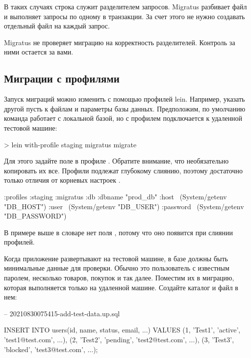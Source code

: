 В таких случаях строка \code{--;;} служит разделителем запросов. Migratus разбивает файл и выполняет запросы по одному в транзакции. За счет этого не нужно создавать отдельный файл на каждый запрос.

Migratus не проверяет миграцию на корректность разделителей. Контроль за ними остается за вами.

\subsection{Миграции с профилями}

Запуск миграций можно изменить с помощью профилей lein. Например, указать другой пусть к файлам и параметры базы данных. Предположим, по умолчанию команда  работает с локальной базой, но с профилем  подключается к удаленной тестовой машине:

\begin{english}
  \begin{bash}
> lein with-profile staging migratus migrate
  \end{bash}
\end{english}

Для этого задайте поле  в профиле . Обратите внимание, что необязательно копировать их все. Профили  подлежат глубокому слиянию, поэтому достаточно только отличия от корневых настроек .

\begin{english}
  \begin{clojure}
{:profiles
 {:staging
  {:migratus
   {:db {:dbname "prod_db"
         :host ~(System/getenv "DB_HOST")
         :user ~(System/getenv "DB_USER")
         :password ~(System/getenv "DB_PASSWORD")}}}}}
  \end{clojure}
\end{english}

В примере выше в словаре  нет поля , потому что оно появится при слиянии профилей.





Когда приложение развертывают на тестовой машине, в базе должны быть минимальные данные для проверки. Обычно это пользователь с известным паролем, несколько товаров, покупок и так далее. Поместим их в миграцию, которая выполняется только на удаленной машине. Создайте каталог  и файл в нем:

\begin{english}
  \begin{sql}
-- 20210830075415-add-test-data.up.sql

INSERT INTO users(id, name, status, email, ...)
VALUES
 (1, 'Test1', 'active',  'test1@test.com', ...),
 (2, 'Test2', 'pending', 'test2@test.com', ...),
 (3, 'Test3', 'blocked', 'test3@test.com', ...);
  \end{sql}
\end{english}

